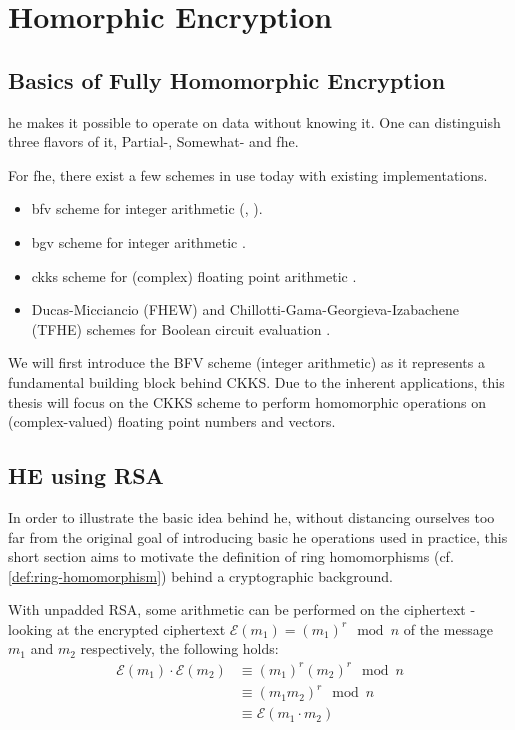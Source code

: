 \chapter{Homorphic Encryption}

\section{Basics of Fully Homomorphic Encryption}
\gls{he} makes it possible to operate on data without knowing it.
One can distinguish three flavors of it, Partial-, Somewhat- and \gls{fhe}.

For \Gls{fhe}, there exist a few schemes in use today with existing implementations.
\begin{itemize}
  \item \gls{bfv} scheme for integer arithmetic
        (\cite{2012-fv-original}, \cite{2012-brakerski}).
  \item \gls{bgv} scheme for integer arithmetic \parencite{2012-bgv-original}.
  \item \gls{ckks} scheme for (complex) floating point arithmetic \parencite{2017-ckks-original}.
  \item Ducas-Micciancio (FHEW) and Chillotti-Gama-Georgieva-Izabachene (TFHE) schemes for Boolean circuit evaluation
        \parencite{2019-tfhe-original}.
\end{itemize}

We will first introduce the BFV scheme (integer arithmetic) as it represents a fundamental building block behind CKKS.
Due to the inherent applications, this thesis will focus on the CKKS scheme to perform homomorphic operations on (complex-valued) floating point numbers and vectors.

\section{HE using RSA}
In order to illustrate the basic idea behind \Gls{he}, without distancing ourselves too far from the original goal of introducing basic \gls{he} operations used in practice, this short section aims to motivate the definition of ring homomorphisms (cf. \autoref{def:ring-homomorphism}) behind a cryptographic background.

With unpadded RSA, some arithmetic can be performed on the ciphertext - %
looking at the encrypted ciphertext $\mathcal{E}(m_1) = (m_1)^r \mod n$
of the message $m_1$ and $m_2$ respectively, the following holds:
\begin{align*}
  \mathcal{E}(m_1) \cdot \mathcal{E}(m_2)
   & \equiv (m_1)^r (m_2)^r \mod n     \\
   & \equiv (m_1 m_2)^r \mod n         \\
   & \equiv \mathcal{E}(m_1 \cdot m_2)
\end{align*}

